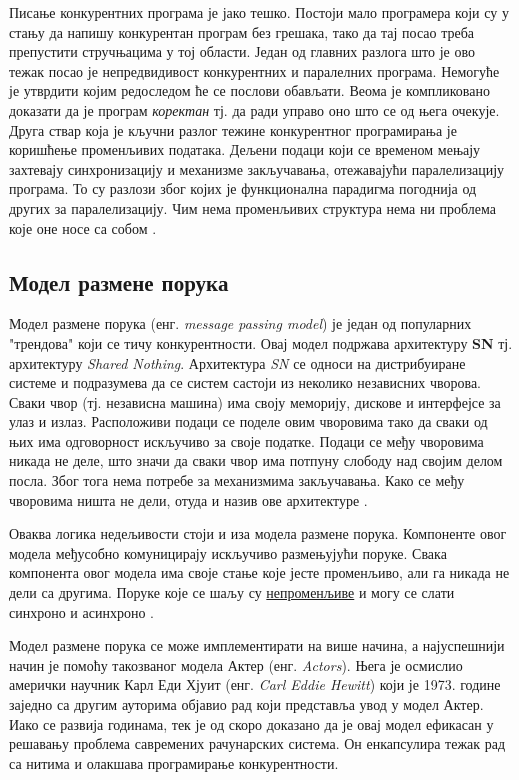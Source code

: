\documentclass[12pt,oneside]{memoir}
\begin{document}
Писање конкурентних програма је јако тешко. Постоји мало програмера који су у стању да напишу конкурентан програм без грешака, тако да тај посао треба препустити стручњацима у тој области. Један од главних разлога што је ово тежак посао је непредвидивост конкурентних и паралелних програма. Немогуће је утврдити којим редоследом ће се послови обављати. Веома је компликовано доказати да је програм \textit{коректан} тј. да ради управо оно што се од њега очекује. Друга ствар која је кључни разлог тежине конкурентног програмирања је коришћење променљивих података. Дељени подаци који се временом мењају захтевају синхронизацију и механизме закључавања, отежавајући паралелизацију програма. То су разлози због којих је функционална парадигма погоднија од других за паралелизацију. Чим нема променљивих структура нема ни проблема које оне носе са собом \cite{progInScala3}.

\subsection{Модел размене порука}

Модел размене порука (енг. \textit{message passing model}) је један од популарних "трендова" који се тичу конкурентности. Овај модел подржава архитектуру \textbf{SN} тј. архитектуру \textit{Shared Nothing}. Архитектура \textit{SN} се односи на дистрибуиране системе и подразумева да се систем састоји из неколико независних чворова. Сваки чвор (тј. независна машина) има своју меморију, дискове и интерфејсе за улаз и излаз. Расположиви подаци се поделе овим чворовима тако да сваки од њих има одговорност искључиво за своје податке. Подаци се међу чворовима никада не деле, што значи да сваки чвор има потпуну слободу над својим делом посла. Због тога нема потребе за механизмима закључавања. Како се међу чворовима ништа не дели, отуда и назив ове архитектуре \cite{SNvsSD, warehouse}.

Оваква логика недељивости стоји и иза модела размене порука. Компоненте овог модела међусобно комуницирају искључиво размењујући поруке. Свака компонента овог модела има своје стање које јесте променљиво, али га никада не дели са другима. Поруке које се шаљу су \underline{непроменљиве} и могу се слати синхроно и асинхроно \cite{progInScala}.

Модел размене порука се може имплементирати на више начина, а најуспешнији начин је помоћу такозваног модела Актер (енг. \textit{Actors}). Њега је осмислио амерички научник Карл Еди Хјуит (енг. \textit{Carl Eddie Hewitt}) који је 1973. године заједно са другим ауторима објавио рад који представља увод у модел Актер. Иако се развија годинама, тек је од скоро доказано да је овај модел ефикасан у решавању проблема савремених рачунарских система. Он енкапсулира тежак рад са нитима и олакшава програмирање конкурентности. 
\end{document}
